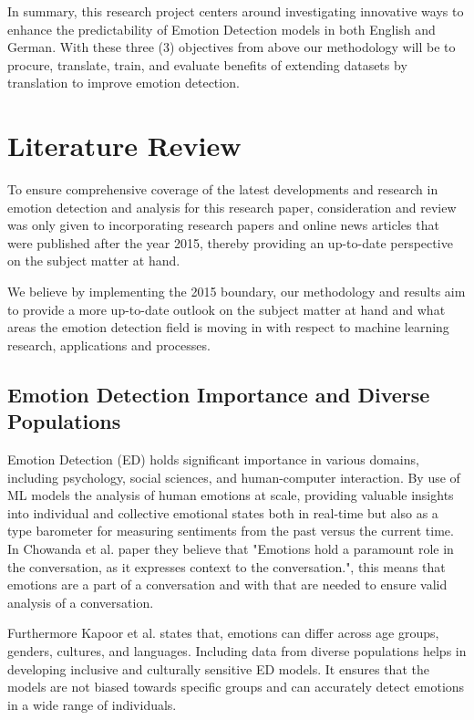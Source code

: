 \documentclass[11pt]{article}
\begin{document}
In summary, this research project centers around investigating innovative ways to enhance the predictability of Emotion Detection models in both English and German. With these three (3) objectives from above our methodology will be to procure, translate, train, and evaluate benefits of extending datasets by translation to improve emotion detection. 

\clearpage
\section{Literature Review}
To ensure comprehensive coverage of the latest developments and research in emotion detection and analysis for this research paper, consideration and review was only given to incorporating research papers and online news articles that were published after the year 2015, thereby providing an up-to-date perspective on the subject matter at hand.

We believe by implementing the 2015 boundary, our methodology and results aim to provide a more up-to-date outlook on the subject matter at hand and what areas the emotion detection field is moving in with respect to machine learning research, applications and processes.

\subsection{Emotion Detection Importance and Diverse Populations}
Emotion Detection (ED) holds significant importance\cite{Sarker2021} in various domains, including psychology, social sciences, and human-computer interaction. By use of ML models\cite{CHOWANDA-2021821} the analysis of human emotions at scale, providing valuable insights into individual and collective emotional states both in real-time but also as a type barometer for measuring sentiments from the past versus the current time. In Chowanda et al. paper\cite{CHOWANDA-2021821} they believe that "Emotions hold a paramount role in the conversation, as it expresses context to the conversation.", this means that emotions are a part of a conversation and with that are needed to ensure valid analysis of a conversation.

Furthermore Kapoor et al. \cite{KAPOOR2023120882} states that, emotions can differ across age groups, genders, cultures, and languages. Including data from diverse populations helps in developing inclusive and culturally sensitive ED models. It ensures that the models are not biased towards specific groups and can accurately detect emotions in a wide range of individuals.
\end{document}
